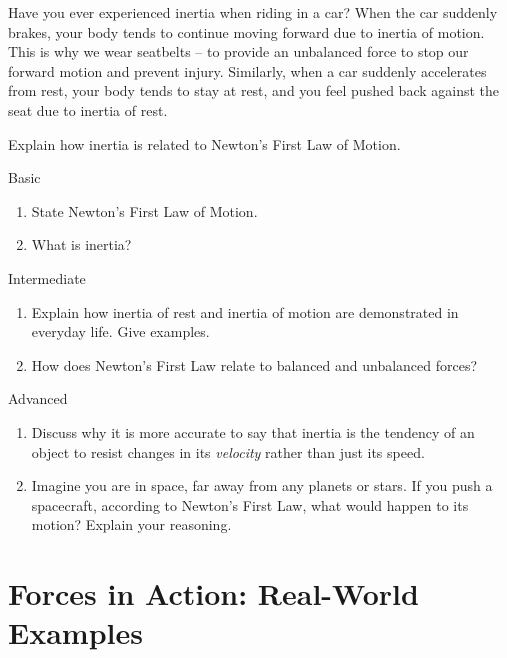 \begin{example}
Have you ever experienced inertia when riding in a car?  When the car suddenly brakes, your body tends to continue moving forward due to inertia of motion.  This is why we wear seatbelts – to provide an unbalanced force to stop our forward motion and prevent injury.  Similarly, when a car suddenly accelerates from rest, your body tends to stay at rest, and you feel pushed back against the seat due to inertia of rest.
\end{example}

\begin{stopandthink}
Explain how inertia is related to Newton's First Law of Motion.
\end{stopandthink}

\begin{tieredquestions}{Basic}
\begin{enumerate}
    \item State Newton's First Law of Motion.
    \item What is inertia?
\end{enumerate}
\end{tieredquestions}

\begin{tieredquestions}{Intermediate}
\begin{enumerate}
    \item Explain how inertia of rest and inertia of motion are demonstrated in everyday life. Give examples.
    \item How does Newton's First Law relate to balanced and unbalanced forces?
\end{enumerate}
\end{tieredquestions}

\begin{tieredquestions}{Advanced}
\begin{enumerate}
    \item  Discuss why it is more accurate to say that inertia is the tendency of an object to resist changes in its \textit{velocity} rather than just its speed.
    \item  Imagine you are in space, far away from any planets or stars.  If you push a spacecraft, according to Newton's First Law, what would happen to its motion? Explain your reasoning.
\end{enumerate}
\end{tieredquestions}


\section{Forces in Action: Real-World Examples}

